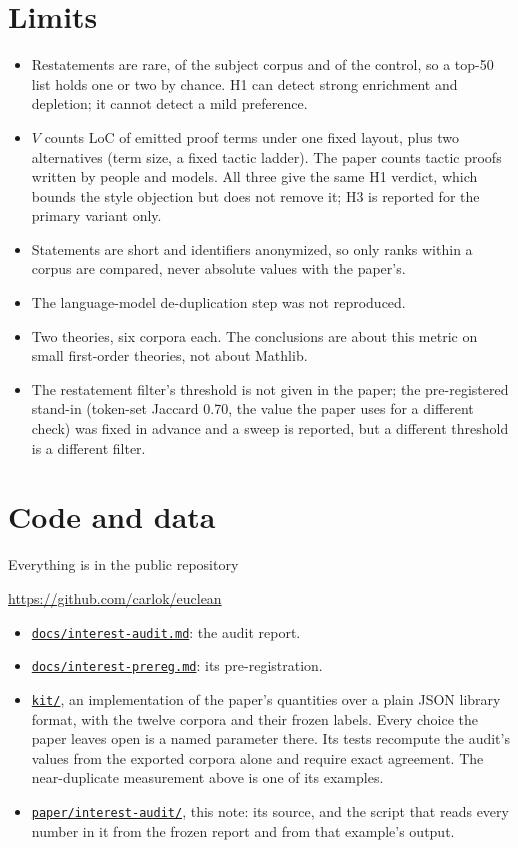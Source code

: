 \documentclass[11pt,a4paper]{article}
\newcommand{\repo}[2]{\href{https://github.com/carlok/euclean/#1/main/#2}{\texttt{#2}}}
\begin{document}
\section{Limits}

\begin{itemize}
\item Restatements are rare, \subjectBaseRate{} of the subject corpus and
  \controlBaseRate{} of the control, so a top-50 list holds one or two by
  chance. H1 can detect strong enrichment and depletion; it cannot detect a
  mild preference.
\item $V$ counts LoC of emitted proof terms under one fixed layout, plus two
  alternatives (term size, a fixed tactic ladder). The paper counts tactic
  proofs written by people and models. All three give the same H1 verdict,
  which bounds the style objection but does not remove it; H3 is reported for
  the primary variant only.
\item Statements are short and identifiers anonymized, so only ranks within a
  corpus are compared, never absolute values with the paper's.
\item The language-model de-duplication step was not reproduced.
\item Two theories, six corpora each. The conclusions are about this metric on
  small first-order theories, not about Mathlib.
\item The restatement filter's threshold is not given in the paper; the
  pre-registered stand-in (token-set Jaccard 0.70, the value the paper uses
  for a different check) was fixed in advance and a sweep is reported, but a
  different threshold is a different filter.
\end{itemize}

\section{Code and data}

Everything is in the public repository
\begin{center}\url{https://github.com/carlok/euclean}\end{center}
\begin{itemize}
\item \repo{blob}{docs/interest-audit.md}: the audit report.
\item \repo{blob}{docs/interest-prereg.md}: its pre-registration.
\item \repo{tree}{kit/}, an implementation of the paper's quantities over a plain JSON
  library format, with the twelve corpora and their frozen labels. Every choice
  the paper leaves open is a named parameter there. Its tests recompute the
  audit's values from the exported corpora alone and require exact agreement.
  The near-duplicate measurement above is one of its examples.
\item \repo{tree}{paper/interest-audit/}, this note: its source, and the script that
  reads every number in it from the frozen report and from that example's
  output.
\end{itemize}
\end{document}
